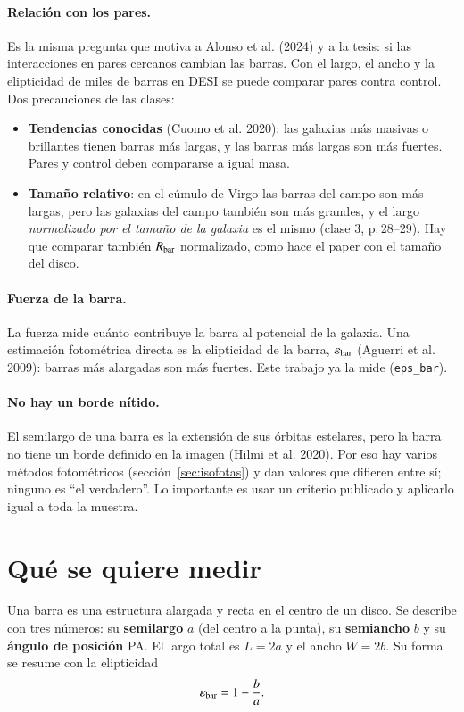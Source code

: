 \documentclass[11pt,a4paper]{article}
\newcommand{\code}[1]{\texttt{#1}}
\begin{document}
\paragraph{Relación con los pares.} Es la misma pregunta que motiva a Alonso et al. (2024) y a la tesis: si las
interacciones en pares cercanos cambian las barras. Con el largo, el ancho y la elipticidad de miles de barras en
DESI se puede comparar pares contra control. Dos precauciones de las clases:
\begin{itemize}
\item \textbf{Tendencias conocidas} (Cuomo et al. 2020): las galaxias más masivas o brillantes tienen barras más
largas, y las barras más largas son más fuertes. Pares y control deben compararse a igual masa.
\item \textbf{Tamaño relativo}: en el cúmulo de Virgo las barras del campo son más largas, pero las galaxias del
campo también son más grandes, y el largo \emph{normalizado por el tamaño de la galaxia} es el mismo (clase 3,
p.\,28--29). Hay que comparar también $R_{\rm bar}$ normalizado, como hace el paper con el tamaño del disco.
\end{itemize}

\paragraph{Fuerza de la barra.} La fuerza mide cuánto contribuye la barra al potencial de la galaxia. Una
estimación fotométrica directa es la elipticidad de la barra, $\varepsilon_{\rm bar}$ (Aguerri et al. 2009):
barras más alargadas son más fuertes. Este trabajo ya la mide (\code{eps\_bar}).

\paragraph{No hay un borde nítido.} El semilargo de una barra es la extensión de sus órbitas estelares, pero la
barra no tiene un borde definido en la imagen (Hilmi et al. 2020). Por eso hay varios métodos fotométricos
(sección~\ref{sec:isofotas}) y dan valores que difieren entre sí; ninguno es ``el verdadero''. Lo importante es
usar un criterio publicado y aplicarlo igual a toda la muestra.


\section{Qué se quiere medir}\label{sec:problema}

Una barra es una estructura alargada y recta en el centro de un disco. Se describe con tres números: su
\textbf{semilargo} $a$ (del centro a la punta), su \textbf{semiancho} $b$ y su \textbf{ángulo de posición} PA.
El largo total es $L = 2a$ y el ancho $W = 2b$. Su forma se resume con la elipticidad
\begin{equation}
\varepsilon_{\rm bar} = 1 - \frac{b}{a}.
\end{equation}
\end{document}
